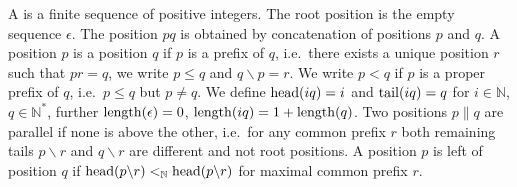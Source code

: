 
\begin{definition}\label{def:position}
	A  is a finite sequence of positive integers.
	The root position is the empty sequence \( \epsilon \).
	The position \( pq \) is obtained by concatenation of positions \( p \) and \( q \).
	A position \( p \) is  a position \( q \) if \( p \) is a prefix of \( q \),
	i.e.~there exists a unique position \( r \) such that \( pr = q \),
	we write \( p\leq q \) and \( q\backslash p = r \).
	We write \( p<q \) if \( p \) is a proper prefix of \( q \), i.e.~\( p\leq q \) but \( p\neq q \).
	We define
	\( \operatorname{head}(iq)=i \) and
	\( \operatorname{tail}(iq) = q \)
	for \( i\in\mathbb{N} \),
	\( q\in\mathbb{N}^* \),
	further
	\( \operatorname{length}(\epsilon)=0 \),
	\( \operatorname{length}(iq) = 1 + \operatorname{length}(q) \).
%
	Two positions \( p\parallel q \) are parallel if none is above the other,
	i.e.~for any common prefix \( r \) both remaining tails
	\( p\backslash r \) and \( q\backslash r \) are different and not root positions.
	A position \( p \) is left of position \( q \) if \( \operatorname{head}(p\backslash r) <_{\mathbb{N}} \operatorname{head}(p\backslash r) \)
	for maximal common prefix \( r \).

\end{definition}

